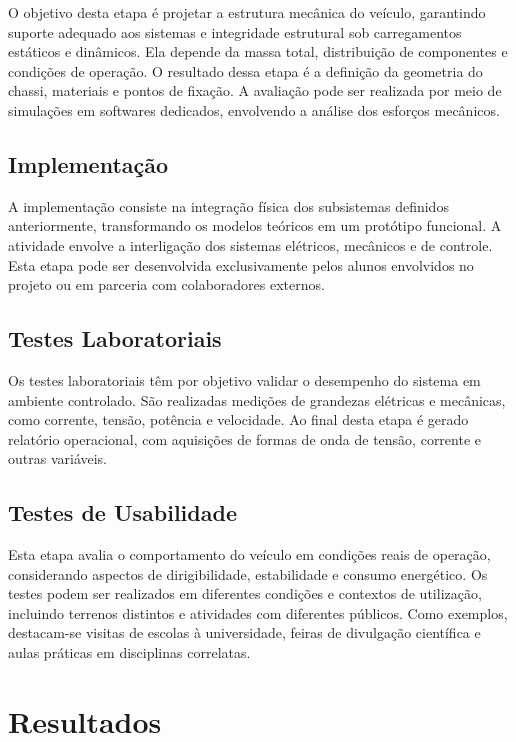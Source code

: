 \documentclass[conference]{IEEEtran}
\begin{document}
O objetivo desta etapa é projetar a estrutura mecânica do veículo, garantindo suporte adequado aos sistemas e integridade estrutural sob carregamentos estáticos e dinâmicos. Ela depende da massa total, distribuição de componentes e condições de operação. O resultado dessa etapa é a definição da geometria do chassi, materiais e pontos de fixação. A avaliação pode ser realizada por meio de simulações em softwares dedicados, envolvendo a análise dos esforços mecânicos.

\subsection{Implementação}

A implementação consiste na integração física dos subsistemas definidos anteriormente, transformando os modelos teóricos em um protótipo funcional. A atividade envolve a interligação dos sistemas elétricos, mecânicos e de controle. Esta etapa pode ser desenvolvida exclusivamente pelos alunos envolvidos no projeto ou em parceria com colaboradores externos.

\subsection{Testes Laboratoriais}

Os testes laboratoriais têm por objetivo validar o desempenho do sistema em ambiente controlado. São realizadas medições de grandezas elétricas e mecânicas, como corrente, tensão, potência e velocidade. Ao final desta etapa é gerado relatório operacional, com aquisições de formas de onda de tensão, corrente e outras variáveis.

\subsection{Testes de Usabilidade}

Esta etapa avalia o comportamento do veículo em condições reais de operação, considerando aspectos de dirigibilidade, estabilidade e consumo energético. Os testes podem ser realizados em diferentes condições e contextos de utilização, incluindo terrenos distintos e atividades com diferentes públicos. Como exemplos, destacam-se visitas de escolas à universidade, feiras de divulgação científica e aulas práticas em disciplinas correlatas.


\section{Resultados}
\end{document}
